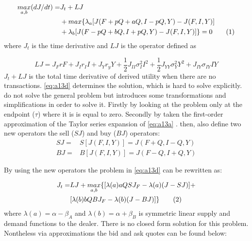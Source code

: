 \documentclass{kththesis}
\theoremstyle{definition}
\newcommand\numberthis{\addtocounter{equation}{1}\tag{\theequation}}
\begin{document}
\begin{align*}
    \label{eq:a13d}
    \underset{a,b}{max}(dJ/dt) = & J_t + LJ \\
    & + max\{\lambda_a[J(F+pQ+aQ, I-pQ,Y) - J(F,I,Y)] \\
    & + \lambda_b [J(F-pQ+bQ, I+pQ,Y) - J(F,I,Y)] \} = 0 \numberthis
\end{align*}
where $J_t$ is the time derivative and $LJ$ is the operator defined as

\begin{equation}
    LJ = J_{F}rF + J_{I}r_{I}I+J_{Y}r_{y}Y+\frac{1}{2}J_{II}\sigma^{2}_{I}I^{2}+ \frac{1}{2}J_{YY}\sigma^{2}_{Y}Y^{2} + J_{IY}\sigma_{IY}IY
\end{equation}
$J_t + LJ$ is the total time derivative of derived utility when there are no transactions. \autoref{eq:a13d} determines the solution, which is hard to solve explicitly. \textcite{ho1981optimal} do not solve the general problem but introduces some transformations and simplifications in order to solve it. Firstly by looking at the problem only at the endpoint ($\tau$) where it is is equal to zero. Secondly by taken the first-order approximation of the Taylor series expansion of \autoref{eq:a13a} \parencite{o1995market}. \textcite{ho1981optimal} then, also define two new operators the sell ($SJ$) and buy ($BJ$) operators:
\begin{align}
    \label{eq:a13e}
    SJ = & S[J(F,I,Y)] = J(F+Q,I-Q, Y) \\
    BJ = & B[J(F,I,Y)] = J(F-Q, I+Q, Y)
\end{align}

By using the new operators the problem in \autoref{eq:a13d} can be rewritten as:

\begin{align*}
    \label{eq:a13e2}
    J_{t} = & LJ + \underset{a,b}{max}\{[\lambda(a)aQSJ_{F} - \lambda(a)(J-SJ)] + \\
    & [\lambda(b)bQBJ_{F} - \lambda(b)(J-BJ)]\} 
    \numberthis
\end{align*}
where $\lambda(a) = \alpha - \beta_{A}$ and $\lambda(b) = \alpha + \beta_{B} $ is symmetric linear supply and demand functions to the dealer. There is no closed form solution for this problem. Nontheless via approximations the bid and ask quotes can be found below:
\end{document}
